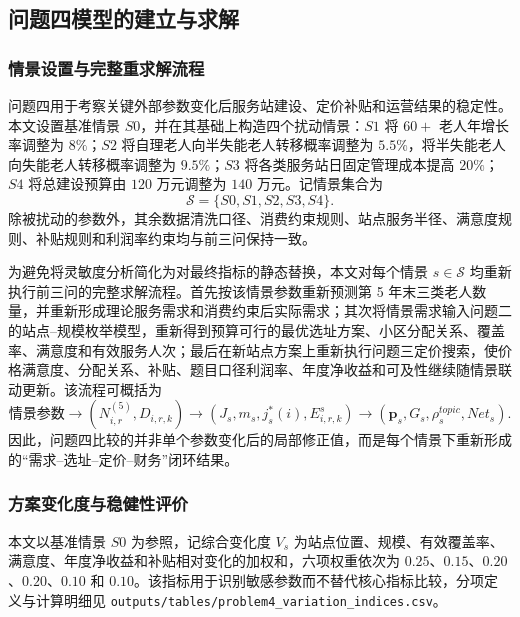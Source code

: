 \subsection{问题四模型的建立与求解}

\subsubsection{情景设置与完整重求解流程}

问题四用于考察关键外部参数变化后服务站建设、定价补贴和运营结果的稳定性。本文设置基准情景 $S0$，并在其基础上构造四个扰动情景：$S1$ 将 $60+$ 老人年增长率调整为 $8\%$；$S2$ 将自理老人向半失能老人转移概率调整为 $5.5\%$，将半失能老人向失能老人转移概率调整为 $9.5\%$；$S3$ 将各类服务站日固定管理成本提高 $20\%$；$S4$ 将总建设预算由 $120$ 万元调整为 $140$ 万元。记情景集合为
\begin{equation}
  \mathcal{S}=\{S0,S1,S2,S3,S4\}.
  \label{eq:q4-scenario-set}
\end{equation}
除被扰动的参数外，其余数据清洗口径、消费约束规则、站点服务半径、满意度规则、补贴规则和利润率约束均与前三问保持一致。

为避免将灵敏度分析简化为对最终指标的静态替换，本文对每个情景 $s\in\mathcal{S}$ 均重新执行前三问的完整求解流程。首先按该情景参数重新预测第 5 年末三类老人数量，并重新形成理论服务需求和消费约束后实际需求；其次将情景需求输入问题二的站点--规模枚举模型，重新得到预算可行的最优选址方案、小区分配关系、覆盖率、满意度和有效服务人次；最后在新站点方案上重新执行问题三定价搜索，使价格满意度、分配关系、补贴、题目口径利润率、年度净收益和可及性继续随情景联动更新。该流程可概括为
\begin{equation}
  \text{情景参数}
  \rightarrow
  (N_{i,r}^{(5)},D_{i,r,k})
  \rightarrow
  (J_s,m_s,j_s^*(i),E_{i,r,k}^{s})
  \rightarrow
  (\boldsymbol p_s,G_s,\rho_s^{topic},Net_s).
  \label{eq:q4-resolve-chain}
\end{equation}
因此，问题四比较的并非单个参数变化后的局部修正值，而是每个情景下重新形成的“需求--选址--定价--财务”闭环结果。

\subsubsection{方案变化度与稳健性评价}

本文以基准情景 $S0$ 为参照，记综合变化度 $V_s$ 为站点位置、规模、有效覆盖率、满意度、年度净收益和补贴相对变化的加权和，六项权重依次为 $0.25$、$0.15$、$0.20$、$0.20$、$0.10$ 和 $0.10$。该指标用于识别敏感参数而不替代核心指标比较，分项定义与计算明细见 \texttt{outputs/tables/problem4\_variation\_indices.csv}。

